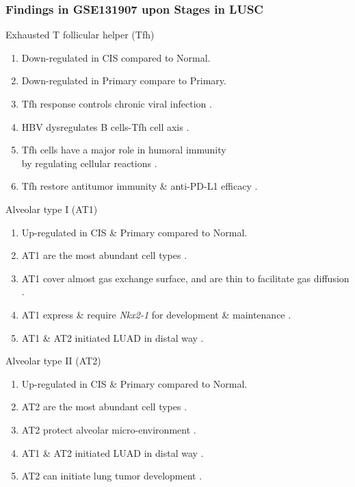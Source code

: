 \documentclass{beamer}
\begin{document}
    \begin{frame}[allowframebreaks]
        \frametitle{Findings in GSE131907 upon Stages in LUSC}

        \begin{block}{Exhausted T follicular helper (Tfh)}
            \begin{enumerate}
                \item Down-regulated in CIS compared to Normal.
                \item Down-regulated in Primary compare to Primary.
                \item Tfh response controls chronic viral infection \cite{Tfh-1}.
                \item HBV dysregulates B cells-Tfh cell axis \cite{Tfh-2}.
                \item Tfh cells have a major role in humoral immunity \\
                    by regulating cellular reactions \cite{Tfh-3}.
                \item Tfh restore antitumor immunity \& anti-PD-L1 efficacy \cite{Tfh-4}.
            \end{enumerate}
        \end{block}

        \begin{block}{Alveolar type I (AT1)}
            \begin{enumerate}
                \item Up-regulated in CIS \& Primary compared to Normal.
                \item AT1 are the most abundant cell types \cite{singlecell1}.
                \item AT1 cover almost gas exchange surface, and are thin to facilitate gas diffusion \cite{AT1-2}.
                \item AT1 express \& require \textit{Nkx2-1} for development \& maintenance \cite{AT1-3}.
                \item AT1 \& AT2 initiated LUAD in distal way \cite{AT1-1}.
            \end{enumerate}
        \end{block}

        \begin{block}{Alveolar type II (AT2)}
            \begin{enumerate}
                \item Up-regulated in CIS \& Primary compared to Normal.
                \item AT2 are the most abundant cell types \cite{singlecell1}.
                \item AT2 protect alveolar micro-environment \cite{AT2-1}.
                \item AT1 \& AT2 initiated LUAD in distal way \cite{AT1-1}.
                \item AT2 can initiate lung tumor development \cite{AT2-2}.
            \end{enumerate}
        \end{block}


\end{frame}
\end{document}
